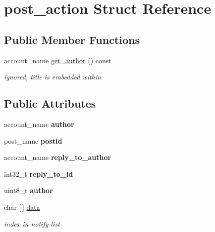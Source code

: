 \hypertarget{structpost__action}{}\section{post\+\_\+action Struct Reference}
\label{structpost__action}
\subsection*{Public Member Functions}
\begin{DoxyCompactItemize}
\item 
\mbox{\label{structpost__action_a9371250f37b9edbe8f8109db7c9bcadf}} 
account\+\_\+name \mbox{\hyperlink{structpost__action_a9371250f37b9edbe8f8109db7c9bcadf}{get\+\_\+author}} () const
\begin{DoxyCompactList}\small\item\em ignored, title is embedded within \end{DoxyCompactList}\end{DoxyCompactItemize}
\subsection*{Public Attributes}
\begin{DoxyCompactItemize}
\item 
\mbox{\label{structpost__action_ad9f907802a5dc17d2ffa7300de80cbcf}} 
account\+\_\+name {\bfseries author}
\item 
\mbox{\label{structpost__action_a83aeb0e8736d03e4cb8aba442c5121e2}} 
post\+\_\+name {\bfseries postid}
\item 
\mbox{\label{structpost__action_afe06d4a82410d7fbc242d41b193b38da}} 
account\+\_\+name {\bfseries reply\+\_\+to\+\_\+author}
\item 
\mbox{\label{structpost__action_a56b91c31a891fc44bf0f8fd8892ffb9a}} 
int32\+\_\+t {\bfseries reply\+\_\+to\+\_\+id}
\item 
\mbox{\label{structpost__action_a3ac82e316166edd7524a3aea7af65ad6}} 
uint8\+\_\+t {\bfseries author}
\item 
\mbox{\label{structpost__action_aacd72268083afa228da45b33065a1bfc}} 
char \mbox{[}$\,$\mbox{]} \mbox{\hyperlink{structpost__action_aacd72268083afa228da45b33065a1bfc}{data}}
\begin{DoxyCompactList}\small\item\em index in notify list \end{DoxyCompactList}\end{DoxyCompactItemize}


